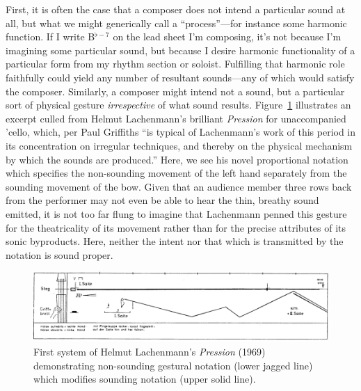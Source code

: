     First, it is often the case that a composer does not intend a particular sound at all, but what we might generically call a ``process''---for instance some harmonic function. If I write B$^{\flat-7}$ on the lead sheet I'm composing, it's not because I'm imagining some particular sound, but because I desire harmonic functionality of a particular form from my rhythm section or soloist. Fulfilling that harmonic role faithfully could yield any number of resultant sounds---any of which would satisfy the composer. Similarly, a composer might intend not a sound, but a particular sort of physical gesture \textit{irrespective} of what sound results. Figure~\ref{fig:pression} illustrates an excerpt culled from Helmut Lachenmann's brilliant \textit{Pression} for unaccompanied 'cello, which, per Paul Griffiths ``is typical of Lachenmann's work of this period in its concentration on irregular techniques, and thereby on the physical mechanism by which the sounds are produced.'' Here, we see his novel proportional notation which specifies the non-sounding movement of the left hand separately from the sounding movement of the bow. Given that an audience member three rows back from the performer may not even be able to hear the thin, breathy sound emitted, it is not too far flung to imagine that Lachenmann penned this gesture for the theatricality of its movement rather than for the precise attributes of its sonic byproducts. Here, neither the intent nor that which is transmitted by the notation is sound proper.\autocite{Griffiths_2011}

        \begin{figure} 
            \centering
            \includegraphics[width=.99\textwidth]{images/chapter2/pression1.png}
            \captionsetup{width=.5\textwidth}
            \caption[First system of Helmut Lachenmann's \textit{Pression} (1969) demonstrating non-sounding ``gestural'' notation (lower jagged line) which modifies sounding notation (upper solid line).]{First system of Helmut Lachenmann's \textit{Pression} (1969) demonstrating non-sounding gestural notation (lower jagged line) which modifies sounding notation (upper solid line).\footnotemark}
            \label{fig:pression}
        \end{figure}

